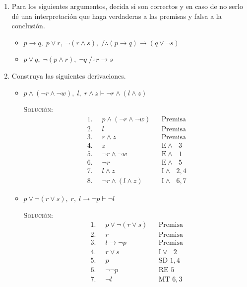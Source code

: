 \documentclass[letterpaper,11pt]{article}
\begin{document}
\begin{enumerate}
    \item Para los siguientes argumentos, decida si son correctos y en caso de 
    no serlo dé una interpretación que haga verdaderas a las premisas y falsa 
    a la conclusión.

    \begin{itemize}
        \item $p → q, \; p \lor r, \; \neg (r \land s), \; /∴ (p → q) → 
               (q \lor \neg s)$
        \item $p \lor q, \; \neg (p \land r), \; \neg q \; /∴ r → s$
    \end{itemize}

    \item Construya las siguientes derivaciones.

    \begin{itemize}
        \item $p \land (\neg r \land \neg w), \; l, \; r \land z ⊢ \neg r 
               \land (l \land z)$
        
        \textsc{Solución:}
        \begin{align*}
            1.& \; \; p \land (\neg r \land \neg w)
            && \text{Premisa} \\ 
            2.& \; \; l
            && \text{Premisa} \\ 
            3.& \; \; r \land z
            && \text{Premisa} \\ 
            4.& \; \; z
            && \text{E$\land$ $3$} \\ 
            5.& \; \; \neg r \land \neg w
            && \text{E$\land$ $1$} \\
            6.& \; \; \neg r
            && \text{E$\land$ $5$} \\ 
            7.& \; \; l \land z
            && \text{I$\land$ $2,4$} \\ 
            8.& \; \; \neg r \land (l \land z)
            && \text{I$\land$ $6, 7$}
        \end{align*}

        \item $p \lor \neg(r \lor s), \; r, \; l → \neg p ⊢ \neg l$
        
        \textsc{Solución:}
        \begin{align*}
            1.& \; \; p \lor \neg(r \lor s)
            && \text{Premisa} \\ 
            2.& \; \; r
            && \text{Premisa} \\ 
            3.& \; \; l → \neg p
            && \text{Premisa} \\ 
            4.& \; \; r \lor s
            && \text{I$\lor$ $2$} \\
            5.& \; \; p
            && \text{SD $1, 4$} \\ 
            6.& \; \; \neg \neg p
            && \text{RE $5$} \\ 
            7.& \; \; \neg l
            && \text{MT $6, 3$}
        \end{align*}


\end{itemize}
\end{enumerate}
\end{document}
